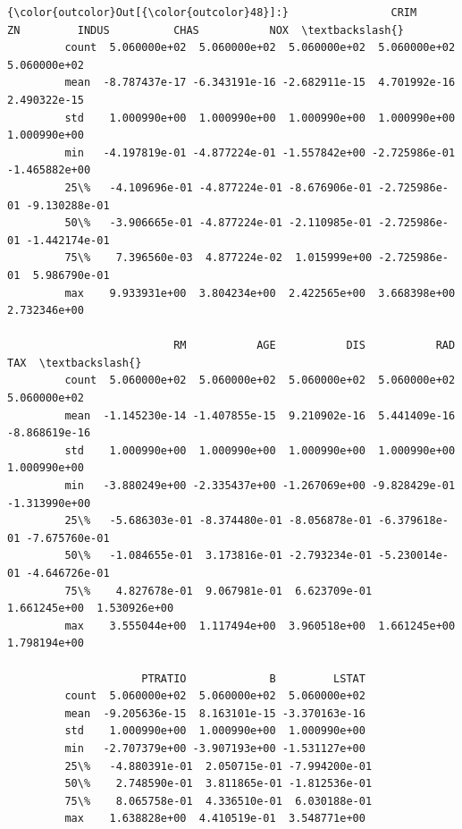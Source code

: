 \documentclass[11pt]{article}
\begin{document}
\begin{Verbatim}[commandchars=\\\{\}]
{\color{outcolor}Out[{\color{outcolor}48}]:}                CRIM            ZN         INDUS          CHAS           NOX  \textbackslash{}
         count  5.060000e+02  5.060000e+02  5.060000e+02  5.060000e+02  5.060000e+02   
         mean  -8.787437e-17 -6.343191e-16 -2.682911e-15  4.701992e-16  2.490322e-15   
         std    1.000990e+00  1.000990e+00  1.000990e+00  1.000990e+00  1.000990e+00   
         min   -4.197819e-01 -4.877224e-01 -1.557842e+00 -2.725986e-01 -1.465882e+00   
         25\%   -4.109696e-01 -4.877224e-01 -8.676906e-01 -2.725986e-01 -9.130288e-01   
         50\%   -3.906665e-01 -4.877224e-01 -2.110985e-01 -2.725986e-01 -1.442174e-01   
         75\%    7.396560e-03  4.877224e-02  1.015999e+00 -2.725986e-01  5.986790e-01   
         max    9.933931e+00  3.804234e+00  2.422565e+00  3.668398e+00  2.732346e+00   
         
                          RM           AGE           DIS           RAD           TAX  \textbackslash{}
         count  5.060000e+02  5.060000e+02  5.060000e+02  5.060000e+02  5.060000e+02   
         mean  -1.145230e-14 -1.407855e-15  9.210902e-16  5.441409e-16 -8.868619e-16   
         std    1.000990e+00  1.000990e+00  1.000990e+00  1.000990e+00  1.000990e+00   
         min   -3.880249e+00 -2.335437e+00 -1.267069e+00 -9.828429e-01 -1.313990e+00   
         25\%   -5.686303e-01 -8.374480e-01 -8.056878e-01 -6.379618e-01 -7.675760e-01   
         50\%   -1.084655e-01  3.173816e-01 -2.793234e-01 -5.230014e-01 -4.646726e-01   
         75\%    4.827678e-01  9.067981e-01  6.623709e-01  1.661245e+00  1.530926e+00   
         max    3.555044e+00  1.117494e+00  3.960518e+00  1.661245e+00  1.798194e+00   
         
                     PTRATIO             B         LSTAT  
         count  5.060000e+02  5.060000e+02  5.060000e+02  
         mean  -9.205636e-15  8.163101e-15 -3.370163e-16  
         std    1.000990e+00  1.000990e+00  1.000990e+00  
         min   -2.707379e+00 -3.907193e+00 -1.531127e+00  
         25\%   -4.880391e-01  2.050715e-01 -7.994200e-01  
         50\%    2.748590e-01  3.811865e-01 -1.812536e-01  
         75\%    8.065758e-01  4.336510e-01  6.030188e-01  
         max    1.638828e+00  4.410519e-01  3.548771e+00  
\end{Verbatim}
            
\end{document}
